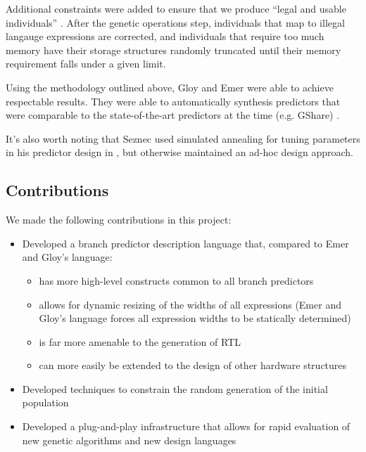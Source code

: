 \documentclass[conference]{IEEEtran}
\begin{document}
Additional constraints were added to ensure that we produce ``legal and usable individuals'' \cite{Emer97}. After the genetic operations step, individuals that map to illegal langauge expressions are corrected, and individuals that require too much memory have their storage structures randomly truncated until their memory requirement falls under a given limit. 

Using the methodology outlined above, Gloy and Emer were able to achieve respectable results. They were able to automatically synthesis predictors that were comparable to the state-of-the-art predictors at the time (e.g. GShare) \cite{Emer97}. 

It's also worth noting that Seznec used simulated annealing for tuning parameters in his predictor design in \cite{Seznec05}, but otherwise maintained an ad-hoc design approach.

\subsection{Contributions}
We made the following contributions in this project:
\begin{itemize}
  \item Developed a branch predictor description language that, compared to Emer and Gloy's language:
    \begin{itemize}
      \item has more high-level constructs common to all branch predictors
      \item allows for dynamic resizing of the widths of all expressions (Emer and Gloy's language forces all expression widths to be statically determined)
      \item is far more amenable to the generation of RTL 
      \item can more easily be extended to the design of other hardware structures
      \end{itemize}
  \item Developed techniques to constrain the random generation of the initial population
  \item Developed a plug-and-play infrastructure that allows for rapid evaluation of new genetic algorithms and new design languages
\end{itemize}
\end{document}

